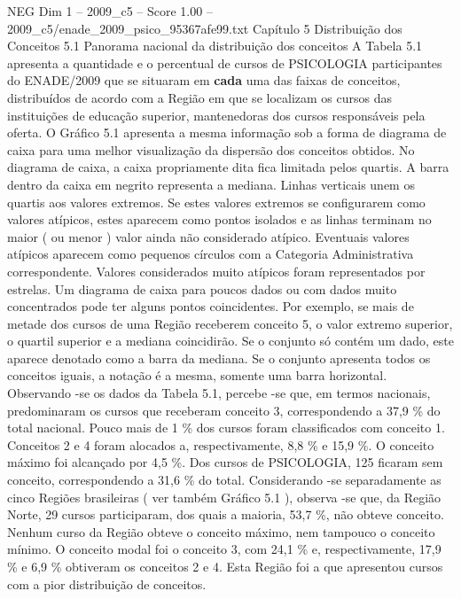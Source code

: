 \begin{textsample}{NEG Dim 1 – 2009\_c5 – Score 1.00 – 2009\_c5/enade\_2009\_psico\_95367afe99.txt}  \label{ex:f1_neg_292}
Capítulo 5 Distribuição dos Conceitos 5.1 Panorama nacional da distribuição dos conceitos A Tabela 5.1 apresenta a quantidade e o percentual de cursos de PSICOLOGIA participantes do ENADE/2009 que se situaram em \textbf{cada} uma das faixas de conceitos, distribuídos de acordo com a Região em que se localizam os cursos das instituições de educação superior, mantenedoras dos cursos responsáveis pela oferta.
O Gráfico 5.1 apresenta a mesma informação sob a forma de diagrama de caixa para uma melhor visualização da dispersão dos conceitos obtidos.
No diagrama de caixa, a caixa propriamente dita fica limitada pelos quartis.
A barra dentro da caixa em negrito representa a mediana.
Linhas verticais unem os quartis aos valores extremos.
Se estes valores extremos se configurarem como valores atípicos, estes aparecem como pontos isolados e as linhas terminam no maior ( ou menor ) valor ainda não considerado atípico.
Eventuais valores atípicos aparecem como pequenos círculos com a Categoria Administrativa correspondente.
Valores considerados muito atípicos foram representados por estrelas.
Um diagrama de caixa para poucos dados ou com dados muito concentrados pode ter alguns pontos coincidentes.
Por exemplo, se mais de metade dos cursos de uma Região receberem conceito 5, o valor extremo superior, o quartil superior e a mediana coincidirão.
Se o conjunto só contém um dado, este aparece denotado como a barra da mediana.
Se o conjunto apresenta todos os conceitos iguais, a notação é a mesma, somente uma barra horizontal.
Observando -se os dados da Tabela 5.1, percebe -se que, em termos nacionais, predominaram os cursos que receberam conceito 3, correspondendo a 37,9 \% do total nacional.
Pouco mais de 1 \% dos cursos foram classificados com conceito 1.
Conceitos 2 e 4 foram alocados a, respectivamente, 8,8 \% e 15,9 \%.
O conceito máximo foi alcançado por 4,5 \%.
Dos cursos de PSICOLOGIA, 125 ficaram sem conceito, correspondendo a 31,6 \% do total.
Considerando -se separadamente as cinco Regiões brasileiras ( ver também Gráfico 5.1 ), observa -se que, da Região Norte, 29 cursos participaram, dos quais a maioria, 53,7 \%, não obteve conceito.
Nenhum curso da Região obteve o conceito máximo, nem tampouco o conceito mínimo.
O conceito modal foi o conceito 3, com 24,1 \% e, respectivamente, 17,9 \% e 6,9 \% obtiveram os conceitos 2 e 4.
Esta Região foi a que apresentou cursos com a pior distribuição de conceitos.

\end{textsample}

